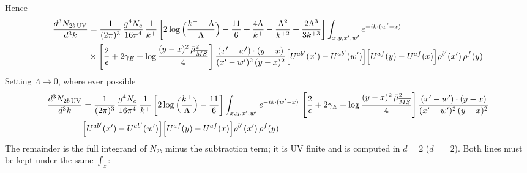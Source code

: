 \documentclass[9pt]{article}
\numberwithin{equation}{section}
\begin{document}
{\color{red}Hence}
\begin{align}
\frac{d^{3}N_{2b\,\rm UV}}{d^{3}k}&=\frac{1}{(2\pi)^{3}}\,\frac{g^{4}N_{c}}{16\pi^{4}}\,\frac{1}{k^{+}}\left[2\log\Big(\frac{k^{+}-\Lambda}{\Lambda}\Big)-\frac{11}{6}+\frac{4\Lambda}{k^{+}}-\frac{\Lambda^{2}}{k^{+2}}+\frac{2\Lambda^{3}}{3k^{+3}}\right]\int_{x,y,x',w'}e^{-ik\cdot(w'-x)}\notag\\
&\times\left[\frac{2}{\epsilon}+2\gamma_{E}+\log\frac{(y-x)^{2}\,\bar\mu^{2}_{\overline{MS}}}{4}\right]\frac{(x'-w')\cdot(y-x)}{(x'-w')^{2}\,(y-x)^{2}}\Big[U^{ab'}(x')-U^{ab'}(w')\Big]\Big[U^{af}(y)-U^{af}(x)\Big]\rho^{b'}(x')\,\rho^{f}(y)
\end{align}
Setting $\Lambda\to 0$, where ever possible
\begin{align}
\frac{d^{3}N_{2b\,\rm UV}}{d^{3}k}&=\frac{1}{(2\pi)^{3}}\,\frac{g^{4}N_{c}}{16\pi^{4}}\,\frac{1}{k^{+}}\left[2\log\Big(\frac{k^{+}}{\Lambda}\Big)-\frac{11}{6}\right]\int_{x,y,x',w'}e^{-ik\cdot(w'-x)}\,\left[\frac{2}{\epsilon}+2\gamma_{E}+\log\frac{(y-x)^{2}\,\bar\mu^{2}_{\overline{MS}}}{4}\right]\frac{(x'-w')\cdot(y-x)}{(x'-w')^{2}\,(y-x)^{2}}\notag \\ & \Big[U^{ab'}(x')-U^{ab'}(w')\Big]\Big[U^{af}(y)-U^{af}(x)\Big]\rho^{b'}(x')\,\rho^{f}(y)
\end{align}
{\color{red}The remainder is the full integrand of $N_{2b}$ minus the subtraction term; it is UV finite and is computed in $d=2$ ($d_{\perp}=2$). Both lines must be kept under the same $\int_{z}$:}
\end{document}
